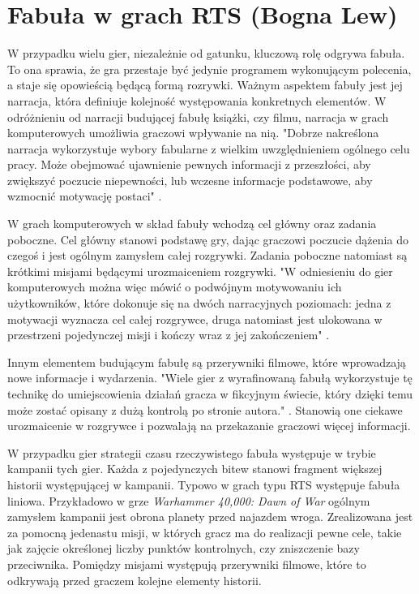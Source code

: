 \section{Fabuła w grach RTS (Bogna Lew)}\label{s:fabula}
W przypadku wielu gier, niezależnie od gatunku, kluczową rolę odgrywa fabuła. To ona sprawia, że gra przestaje być
jedynie programem wykonującym polecenia, a staje się opowieścią będącą formą rozrywki. Ważnym aspektem fabuły jest jej
narracja, która definiuje kolejność występowania konkretnych elementów. W odróżnieniu od narracji budującej
fabułę książki, czy filmu, narracja w grach komputerowych umożliwia graczowi wpływanie na nią. "Dobrze nakreślona
narracja wykorzystuje wybory fabularne z wielkim uwzględnieniem ogólnego celu pracy. Może obejmować ujawnienie pewnych
informacji z przeszłości, aby zwiększyć poczucie niepewności, lub wczesne informacje podstawowe, aby wzmocnić motywację
postaci" \cite{level_design}.

W grach komputerowych w skład fabuły wchodzą cel główny oraz zadania poboczne. Cel główny stanowi podstawę gry, dając
graczowi poczucie dążenia do czegoś i jest ogólnym zamysłem całej rozgrywki. Zadania poboczne natomiast są krótkimi
misjami będącymi urozmaiceniem rozgrywki. "W odniesieniu do gier komputerowych można więc mówić o podwójnym motywowaniu
ich użytkowników, które dokonuje się na dwóch narracyjnych poziomach: jedna z motywacji wyznacza cel całej
rozgrywce, druga natomiast jest ulokowana w przestrzeni pojedynczej misji i kończy wraz z jej zakończeniem" \cite{olbrzymwcieniu}.

Innym elementem budującym fabułę są przerywniki filmowe, które wprowadzają nowe informacje i wydarzenia. "Wiele gier z
wyrafinowaną fabułą wykorzystuje tę technikę do umiejscowienia działań gracza w fikcyjnym świecie, który dzięki temu
może zostać opisany z dużą kontrolą po stronie autora." \cite{understanding_games}. Stanowią one ciekawe urozmaicenie w rozgrywce i
pozwalają na przekazanie graczowi więcej informacji.

W przypadku gier strategii czasu rzeczywistego fabuła występuje w trybie kampanii tych gier. Każda z pojedynczych bitew
stanowi fragment większej historii występującej w kampanii. Typowo w grach typu RTS występuje fabuła liniowa.
Przykładowo w grze \textit{Warhammer 40,000: Dawn of War} ogólnym zamysłem kampanii jest obrona planety przed najazdem wroga.
Zrealizowana jest za pomocną jedenastu misji, w których gracz ma do realizacji pewne cele, takie jak zajęcie określonej
liczby punktów kontrolnych, czy zniszczenie bazy przeciwnika. Pomiędzy misjami występują przerywniki filmowe, które
to odkrywają przed graczem kolejne elementy historii.

